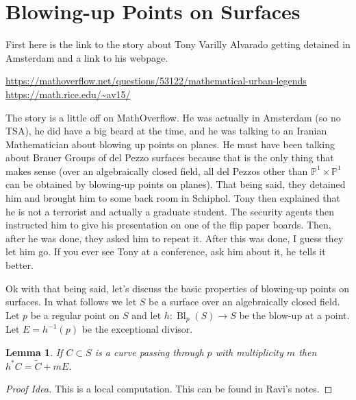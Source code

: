 \documentclass[12pt]{article}
\numberwithin{equation}{section}
\newtheorem{lemma}[theorem]{Lemma}
\theoremstyle{definition}
\theoremstyle{remark}
\newcommand{\PP}{\mathbb{P}}
\newcommand{\Bl}{\operatorname{Bl}}
\begin{document}
\section{Blowing-up Points on Surfaces}
First here is the link to the story about Tony Varilly Alvarado getting detained in Amsterdam and a link to his webpage.
\begin{center}
	\url{https://mathoverflow.net/questions/53122/mathematical-urban-legends}\\
	\url{https://math.rice.edu/~av15/}
\end{center}
The story is a little off on MathOverflow. 
He was actually in Amsterdam (so no TSA), he did have a big beard at the time, and he was talking to an Iranian Mathematician about blowing up points on planes.
He must have been talking about Brauer Groups of del Pezzo surfaces because that is the only thing that makes sense (over an algebraically closed field, all del Pezzos other than $\PP^1\times\PP^1$ can be obtained by blowing-up points on planes). 
That being said, they detained him and brought him to some back room in Schiphol.
Tony then explained that he is not a terrorist and actually a graduate student. 
The security agents then instructed him to give his presentation on one of the flip paper boards. 
Then, after he was done, they asked him to repeat it. 
After this was done, I guess they let him go. 
If you ever see Tony at a conference, ask him about it, he tells it better.

Ok with that being said, let's discuss the basic properties of blowing-up points on surfaces. 
In what follows we let $S$ be a surface over an algebraically closed field.
Let $p$ be a regular point on $S$ and let $h:\Bl_p(S) \to S$ be the blow-up at a point. 
Let $E=h^{-1}(p)$ be the exceptional divisor.

\begin{lemma}
	If $C \subset S$ is a curve passing through $p$ with multiplicity $m$ then $h^*C=\widetilde{C}+mE$. 
\end{lemma}
\begin{proof}[Proof Idea]
	This is a local computation. This can be found in Ravi's notes. 
\end{proof}
\end{document}
